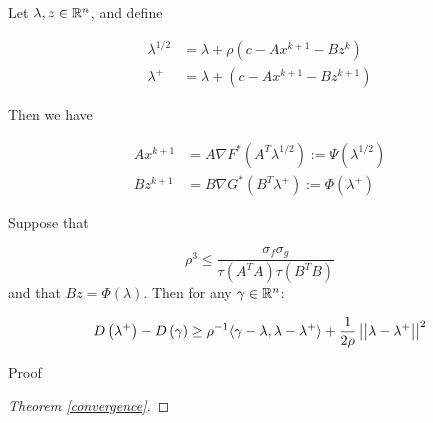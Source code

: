 \documentclass{article}
\begin{document}
\begin{lemma}
Let \(\lambda, z \in {\mathbb{R}}^n\), and define

\begin{align}
\lambda^{1/2} &= \lambda + \rho\left(c - Ax^{k+1} - Bz^{k}\right) \\
\lambda^{+} &= \lambda + \left(c - Ax^{k+1} - Bz^{k+1}\right)
\end{align}

Then we have 

\begin{align}
Ax^{k+1} &= A \nabla F^*\left(A^T \lambda^{1/2}\right) := \Psi\left(\lambda^{1/2}\right) \\
Bz^{k+1} &= B \nabla G^*\left(B^T \lambda^+\right) := \Phi\left(\lambda^+\right)
\end{align}
\end{lemma}

\begin{lemma}
Suppose that

\begin{equation}
\rho^3 \leq \frac{\sigma_f \sigma_g }{\tau\left(A^TA\right)\tau\left(B^TB\right)}
\end{equation}
and that \(Bz = \Phi(\lambda)\). Then for any \(\gamma \in {\mathbb{R}}^n\):

\begin{equation}
D\left(\lambda^+\right) - D\left(\gamma\right) \geq \rho^{-1} \langle \gamma- \lambda, \lambda - \lambda^+ \rangle + \frac{1}{2\rho}\left|\left|\lambda - \lambda^+\right|\right|^2
\end{equation}
\end{lemma}

Proof
\begin{proof}[Theorem \eqref{convergence}]

\end{proof}
\end{document}
